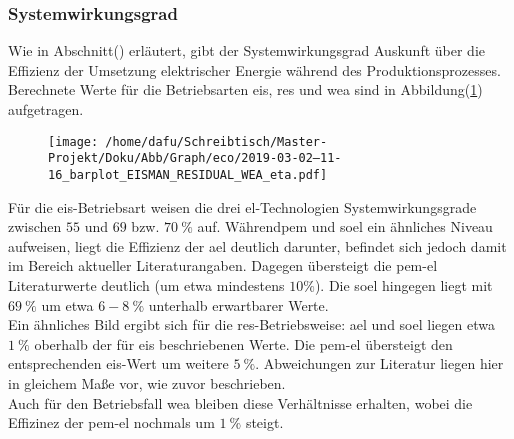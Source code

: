 \documentclass[onecolumn,10pt,titlepage]{article}
\begin{document}
\subsubsection{Systemwirkungsgrad}
Wie in Abschnitt() erläutert, gibt der Systemwirkungsgrad Auskunft über die Effizienz der Umsetzung elektrischer Energie während des Produktionsprozesses. Berechnete Werte für die Betriebsarten \gls{eis}, \gls{res} und \gls{wea} sind in Abbildung(\ref{fig:analy_nC_eta}) aufgetragen.
\begin{figure}[H]
	
	\centering
	\texttt{[image: /home/dafu/Schreibtisch/Master-Projekt/Doku/Abb/Graph/eco/2019-03-02--11-16\_barplot\_EISMAN\_RESIDUAL\_WEA\_eta.pdf]}
	\caption{ }
	\label{fig:analy_nC_eta} 
\end{figure}
Für die \gls{eis}-Betriebsart weisen die drei \gls{el}-Technologien Systemwirkungsgrade zwischen $55 $ und $69$ bzw. $70~\%$ auf. Während\gls{pem} und \gls{soel} ein ähnliches Niveau aufweisen, liegt die Effizienz der \gls{ael} deutlich darunter, befindet sich jedoch damit im Bereich aktueller Literaturangaben.\cite{Buttler2018}   
Dagegen übersteigt die \gls{pem}-\gls{el} Literaturwerte deutlich (um etwa mindestens $10\%$). Die \gls{soel} hingegen liegt mit $69~\%$ um etwa $6-8~\%$ unterhalb erwartbarer Werte.\\
Ein ähnliches Bild ergibt sich für die \gls{res}-Betriebsweise: \gls{ael} und \gls{soel} liegen etwa $1~\%$ oberhalb der für \gls{eis} beschriebenen Werte. Die \gls{pem}-\gls{el} übersteigt den entsprechenden \gls{eis}-Wert um weitere $5~\%$. Abweichungen zur Literatur liegen hier in gleichem Maße vor, wie zuvor beschrieben.\\
Auch für den Betriebsfall \gls{wea} bleiben diese Verhältnisse erhalten, wobei die Effizinez der \gls{pem}-\gls{el} nochmals um $1~ \%$ steigt.\\

%
\end{document}
